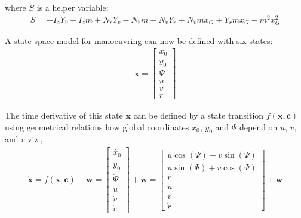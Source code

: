 \documentclass[review]{elsarticle}
\begin{document}
where \(S\) is a helper variable:
\begin{equation}\label{equation:02.01_VMMs:eq_S}
\begin{split}\displaystyle S = - I_{z} Y_{\dot{v}} + I_{z} m + N_{\dot{r}} Y_{\dot{v}} - N_{\dot{r}} m - N_{\dot{v}} Y_{\dot{r}} + N_{\dot{v}} m x_{G} + Y_{\dot{r}} m x_{G} - m^{2} x_{G}^{2}\end{split}
\end{equation}
 
A state space model for manoeuvring can now be defined with six states:
\begin{equation}\label{equation:02.01_VMMs:eq_x}
\begin{split}\displaystyle \mathbf{x} = \left[\begin{matrix}x_{0}\\y_{0}\\\Psi\\u\\v\\r\end{matrix}\right]\end{split}
\end{equation}
 
The time derivative of this state \(\dot{\mathbf{x}}\) can be defined by a state transition \(f(\mathbf{x},\mathbf{c})\) using geometrical relations
how global coordinates \(x_0\), \(y_0\) and \(\Psi\) depend on \(u\), \(v\), and \(r\) viz.,
\begin{equation}\label{equation:02.01_VMMs:eqf}
\begin{split}\displaystyle \dot{\mathbf{x}} = f(\mathbf{x},\mathbf{c}) + \mathbf{w}
                                          = \left[\begin{matrix}\dot{x_0}\\ \dot{y_0} \\ \dot{\Psi} \\\dot{u}\\\dot{v}\\\dot{r}\end{matrix}\right] + \mathbf{w}
                                          = \left[\begin{matrix}u \cos{\left(\Psi \right)} - v \sin{\left(\Psi \right)}\\u \sin{\left(\Psi \right)} + v \cos{\left(\Psi \right)}\\r\\\dot{u}\\\dot{v}\\\dot{r}\end{matrix}\right] + \mathbf{w}\end{split}
\end{equation}
 
\end{document}
